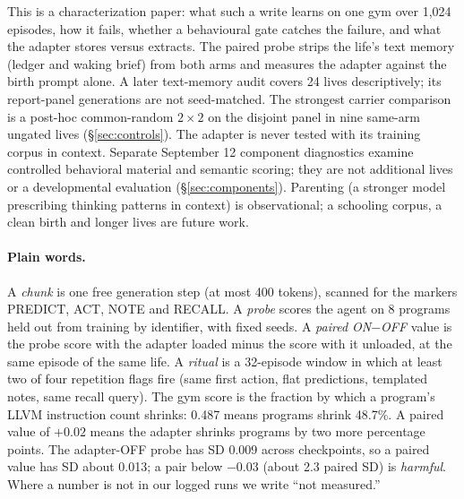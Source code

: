 \documentclass{article}
\newcommand{\onoff}{ON$-$OFF}
\begin{document}
This is a characterization paper: what such a write learns on one gym over 1{,}024 episodes, how it fails, whether a behavioural gate catches the failure, and what the adapter stores versus extracts. The paired probe strips the life's text memory (ledger and waking brief) from both arms and measures the adapter against the birth prompt alone. A later text-memory audit covers 24 lives descriptively; its report-panel generations are not seed-matched. The strongest carrier comparison is a post-hoc common-random $2\times2$ on the disjoint panel in nine same-arm ungated lives (\S\ref{sec:controls}). The adapter is never tested with its training corpus in context. Separate September 12 component diagnostics examine controlled behavioral material and semantic scoring; they are not additional lives or a developmental evaluation (\S\ref{sec:components}).
Parenting (a stronger model prescribing thinking patterns in context) is observational; a schooling corpus, a clean birth and longer lives are future work.

\paragraph{Plain words.} A \emph{chunk} is one free generation step (at most 400 tokens), scanned for the markers PREDICT, ACT, NOTE and RECALL. A \emph{probe} scores the agent on 8 programs held out from training by identifier, with fixed seeds. A \emph{paired \onoff{}} value is the probe score with the adapter loaded minus the score with it unloaded, at the same episode of the same life. A \emph{ritual} is a 32-episode window in which at least two of four repetition flags fire (same first action, flat predictions, templated notes, same recall query). The gym score is the fraction by which a program's LLVM instruction count shrinks: 0.487 means programs shrink 48.7\%. A paired value of $+0.02$ means the adapter shrinks programs by two more percentage points. The adapter-OFF probe has SD 0.009 across checkpoints, so a paired value has SD about 0.013; a pair below $-0.03$ (about 2.3 paired SD) is \emph{harmful}. Where a number is not in our logged runs we write ``not measured.''
\end{document}
